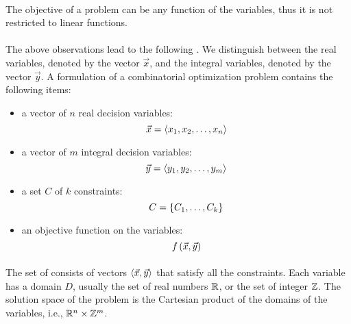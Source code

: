 \paragraph{}
The objective of a problem can be any function of the variables, thus it is not restricted to linear functions.

\paragraph{}
The above observations lead to the following . We distinguish between the real variables, denoted by the vector $\vec{x}$, and the integral variables, denoted by the
vector $\vec{y}$. A formulation of a combinatorial optimization problem contains the following items:
\begin{itemize}
 \item a vector of $n$ real decision variables:
 \begin{equation}
  \vec{x}=\left\langle x_1,x_2,\ldots,x_n \right\rangle
 \end{equation}
 \item a vector of $m$ integral decision variables:
 \begin{equation}
  \vec{y}=\left\langle y_1,y_2,\ldots,y_m \right\rangle
 \end{equation}
 \item a set $C$ of $k$ constraints:
 \begin{equation}
  C=\left\{ C_1,\ldots,C_k \right\}
 \end{equation}
 \item an objective function on the variables:
 \begin{equation}
  f\left( \vec{x},\vec{y} \right)
 \end{equation}
\end{itemize}

\paragraph{}
The set of  consists of vectors $\left\langle \vec{x},\vec{y} \right\rangle$ that satisfy all the constraints. Each variable has a domain $D$, usually the set of real numbers $\mathbb{R}$, or the set of integer $\mathbb{Z}$. The solution space of the problem is the Cartesian product of the domains of the variables, i.e., $\mathbb{R}^n\times\mathbb{Z}^m$.

